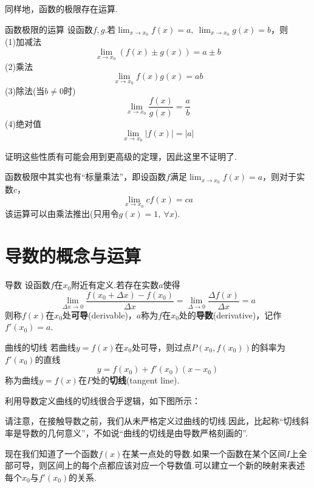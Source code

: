\documentclass[lang=cn, zihao=5]{elegantbook}
\begin{document}
同样地，函数的极限存在运算.

\begin{theorem}{函数极限的运算} %
	设函数$f,g$.若$\lim_{x \to x_0} f(x)=a,~\lim_{x \to x_0} g(x)=b$，则 \\
	(1)加减法$$\lim_{x \to x_0}{(f(x) \pm g(x))} = a \pm b$$
	(2)乘法$$\lim_{x \to x_0}{f(x)g(x)} = ab$$
	(3)除法(当$b \neq 0$时)$$\lim_{x \to x_0}{\frac{f(x)}{g(x)}} = \frac{a}{b}$$
	(4)绝对值$$\lim_{x \to x_0}{|f(x)|} = |a|$$
\end{theorem}
\begin{remark}
	证明这些性质有可能会用到更高级的定理，因此这里不证明了.
\end{remark}
\begin{remark}
	函数极限中其实也有“标量乘法”，即设函数$f$满足$\lim_{x \to x_0}f(x)=a$，则对于实数$c$，$$\lim_{x \to x_0}{cf(x)}=ca$$
	该运算可以由乘法推出(只用令$g(x)=1,~\forall x$).
\end{remark}

\section{导数的概念与运算}

\begin{definition}{导数}
	设函数$f$在$x_0$附近有定义.若存在实数$a$使得$$\lim_{\Delta x \to 0} {\frac{f(x_0+\Delta x)-f(x_0)}{\Delta x}} = \lim_{\Delta \to 0}{\frac{\Delta f(x)}{\Delta x}} = a$$
	则称$f(x)$在$x_0$处\textbf{可导}(derivable)，$a$称为$f$在$x_0$处的\textbf{导数}(derivative)，记作$f'(x_0)=a$.
\end{definition}

\begin{definition}{曲线的切线}
	若曲线$y=f(x)$在$x_0$处可导，则过点$P(x_0,f(x_0))$的斜率为$f'(x_0)$的直线$$y=f(x_0)+f'(x_0)(x-x_0)$$
	称为曲线$y=f(x)$在$P$处的\textbf{切线}(tangent line).
\end{definition}

利用导数定义曲线的切线很合乎逻辑，如下图所示：


请注意，在接触导数之前，我们从未严格定义过曲线的切线.因此，比起称“切线斜率是导数的几何意义”，不如说“曲线的切线是由导数严格刻画的”.

现在我们知道了一个函数$f(x)$在某一点处的导数.如果一个函数在某个区间$I$上全部可导，则区间上的每个点都应该对应一个导数值.可以建立一个新的映射来表述每个$x_0$与$f'(x_0)$的关系.
\end{document}
